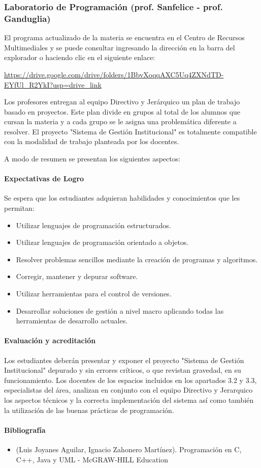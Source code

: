 \subsubsection{Laboratorio de Programación (prof. Sanfelice - prof. Ganduglia)}

El programa actualizado de la materia se encuentra en el Centro de Recursos Multimediales y se puede consultar ingresando la dirección en la barra del explorador o haciendo clic en el siguiente enlace:

\url{https://drive.google.com/drive/folders/1BbvXoqqAXC5Uq4ZXNdTD-EYfUl_R2YkI?usp=drive_link}

Los profesores entregan al equipo Directivo y Jerárquico un plan de trabajo basado en proyectos. Este plan divide en grupos al total de los alumnos que cursan la materia y a cada grupo se le asigna una problemática diferente a resolver. El proyecto "Sistema de Gestión Institucional" es totalmente compatible con la modalidad de trabajo planteada por los docentes.

A modo de resumen se presentan los siguientes aspectos:
\paragraph{Expectativas de Logro}
Se espera que los estudiantes adquieran habilidades y conocimientos que les permitan: 

\begin{itemize}
    \item Utilizar lenguajes de programación estructurados.
    \item Utilizar lenguajes de programación orientado a objetos.
    \item Resolver problemas sencillos mediante la creación de programas y algoritmos.
    \item Corregir, mantener y depurar software.
    \item Utilizar herramientas para el control de versiones.
    \item Desarrollar soluciones de gestión a nivel macro aplicando todas las herramientas de desarrollo actuales. 
\end{itemize}

\paragraph{Evaluación y acreditación}

Los estudiantes deberán presentar y exponer el proyecto "Sistema de Gestión Institucional" depurado y sin errores críticos, o que revistan gravedad, en su funcionamiento. Los docentes de los espacios incluidos en los apartados 3.2 y 3.3, especialistas del área, analizan en conjunto con el equipo Directivo y Jerarquico los aspectos técnicos y la correcta implementación del sistema así como también la utilización de las buenas prácticas de programación.

\paragraph{Bibliografía}
\begin{itemize}
    \item  (Luis Joyanes Aguilar, Ignacio Zahonero Martínez). Programación en C, C++, Java y UML - McGRAW-HILL Education

\end{itemize}
